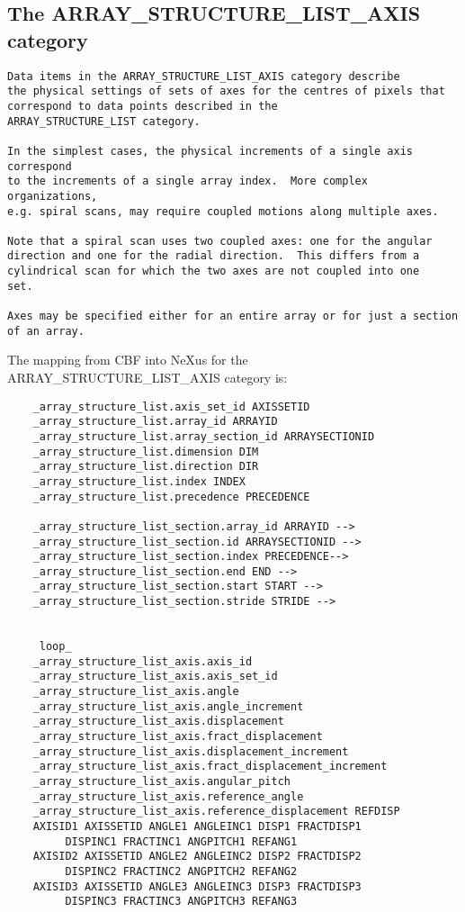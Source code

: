 \documentclass[11pt]{article}
\begin{document}
\subsection{The ARRAY\_STRUCTURE\_LIST\_AXIS category}

{\footnotesize\begin{verbatim}
Data items in the ARRAY_STRUCTURE_LIST_AXIS category describe
the physical settings of sets of axes for the centres of pixels that
correspond to data points described in the
ARRAY_STRUCTURE_LIST category.

In the simplest cases, the physical increments of a single axis correspond
to the increments of a single array index.  More complex organizations,
e.g. spiral scans, may require coupled motions along multiple axes.

Note that a spiral scan uses two coupled axes: one for the angular
direction and one for the radial direction.  This differs from a
cylindrical scan for which the two axes are not coupled into one 
set.

Axes may be specified either for an entire array or for just a section
of an array.
\end{verbatim}

The mapping from CBF into NeXus for the ARRAY\_STRUCTURE\_LIST\_AXIS category is:

\begin{verbatim}     
    _array_structure_list.axis_set_id AXISSETID
    _array_structure_list.array_id ARRAYID
    _array_structure_list.array_section_id ARRAYSECTIONID
    _array_structure_list.dimension DIM
    _array_structure_list.direction DIR 
    _array_structure_list.index INDEX
    _array_structure_list.precedence PRECEDENCE
       
    _array_structure_list_section.array_id ARRAYID -->
    _array_structure_list_section.id ARRAYSECTIONID -->
    _array_structure_list_section.index PRECEDENCE-->
    _array_structure_list_section.end END -->
    _array_structure_list_section.start START -->
    _array_structure_list_section.stride STRIDE -->
                
           
     loop_      
    _array_structure_list_axis.axis_id 
    _array_structure_list_axis.axis_set_id 
    _array_structure_list_axis.angle 
    _array_structure_list_axis.angle_increment 
    _array_structure_list_axis.displacement
    _array_structure_list_axis.fract_displacement
    _array_structure_list_axis.displacement_increment
    _array_structure_list_axis.fract_displacement_increment
    _array_structure_list_axis.angular_pitch
    _array_structure_list_axis.reference_angle
    _array_structure_list_axis.reference_displacement REFDISP
    AXISID1 AXISSETID ANGLE1 ANGLEINC1 DISP1 FRACTDISP1
         DISPINC1 FRACTINC1 ANGPITCH1 REFANG1
    AXISID2 AXISSETID ANGLE2 ANGLEINC2 DISP2 FRACTDISP2
         DISPINC2 FRACTINC2 ANGPITCH2 REFANG2
    AXISID3 AXISSETID ANGLE3 ANGLEINC3 DISP3 FRACTDISP3
         DISPINC3 FRACTINC3 ANGPITCH3 REFANG3


\end{verbatim}}
\end{document}
